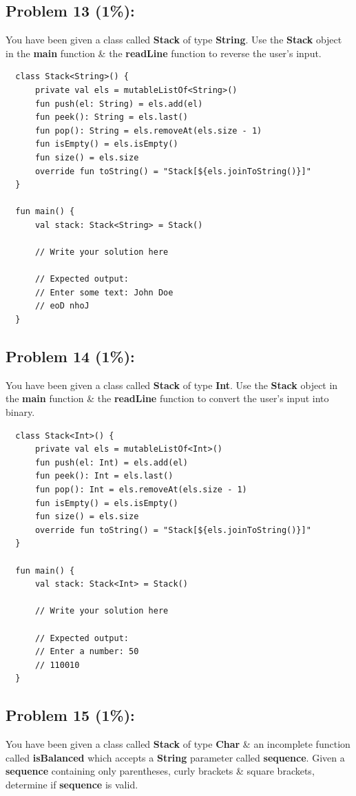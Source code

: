 \documentclass{article}
\begin{document}
\subsection*{Problem 13 (1\%):}
You have been given a class called \textbf{Stack} of type \textbf{String}. Use the \textbf{Stack} object in the \textbf{main} function \& the \textbf{readLine} function to reverse the user's input.

\begin{verbatim}
  class Stack<String>() {
      private val els = mutableListOf<String>()
      fun push(el: String) = els.add(el)
      fun peek(): String = els.last()
      fun pop(): String = els.removeAt(els.size - 1)
      fun isEmpty() = els.isEmpty()
      fun size() = els.size
      override fun toString() = "Stack[${els.joinToString()}]"
  }

  fun main() {
      val stack: Stack<String> = Stack()

      // Write your solution here

      // Expected output:
      // Enter some text: John Doe
      // eoD nhoJ
  }
\end{verbatim}

\subsection*{Problem 14 (1\%):}
You have been given a class called \textbf{Stack} of type \textbf{Int}. Use the \textbf{Stack} object in the \textbf{main} function \& the \textbf{readLine} function to convert the user's input into binary.

\begin{verbatim}
  class Stack<Int>() {
      private val els = mutableListOf<Int>()
      fun push(el: Int) = els.add(el)
      fun peek(): Int = els.last()
      fun pop(): Int = els.removeAt(els.size - 1)
      fun isEmpty() = els.isEmpty()
      fun size() = els.size
      override fun toString() = "Stack[${els.joinToString()}]"
  }

  fun main() {
      val stack: Stack<Int> = Stack()

      // Write your solution here

      // Expected output:
      // Enter a number: 50
      // 110010
  }
\end{verbatim}

\subsection*{Problem 15 (1\%):}
You have been given a class called \textbf{Stack} of type \textbf{Char} \& an incomplete function called \textbf{isBalanced} which accepts a \textbf{String} parameter called \textbf{sequence}. Given a \textbf{sequence} containing only parentheses, curly brackets \& square brackets, determine if \textbf{sequence} is valid.
\end{document}
